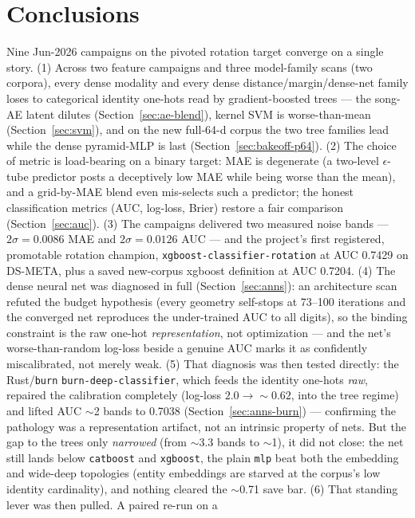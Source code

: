 \documentclass[11pt]{article}
\begin{document}
\section{Conclusions}
\label{sec:conclusions}
Nine Jun-2026 campaigns on the pivoted rotation target converge on a single
story. (1) Across two feature campaigns and three model-family scans (two
corpora), every dense modality and every dense distance/margin/dense-net family
loses to categorical identity one-hots read by gradient-boosted trees --- the
song-AE latent dilutes (Section~\ref{sec:ae-blend}), kernel SVM is
worse-than-mean (Section~\ref{sec:svm}), and on the new full-64-d corpus the two
tree families lead while the dense pyramid-MLP is last
(Section~\ref{sec:bakeoff-p64}). (2) The choice of metric is load-bearing on a
binary target: MAE is degenerate (a two-level $\epsilon$-tube predictor posts a
deceptively low MAE while being worse than the mean), and a grid-by-MAE blend
even mis-selects such a predictor; the honest classification metrics (AUC,
log-loss, Brier) restore a fair comparison (Section~\ref{sec:auc}). (3) The
campaigns delivered two measured noise bands --- $2\sigma=0.0086$ MAE and
$2\sigma=0.0126$ AUC --- and the project's first registered, promotable rotation
champion, \texttt{xgboost-classifier-rotation} at AUC 0.7429 on DS-META, plus a
saved new-corpus xgboost definition at AUC 0.7204. (4) The dense neural net was
diagnosed in full (Section~\ref{sec:anns}): an architecture scan refuted the
budget hypothesis (every geometry self-stops at 73--100 iterations and the
converged net reproduces the under-trained AUC to all digits), so the binding
constraint is the raw one-hot \emph{representation}, not optimization --- and the
net's worse-than-random log-loss beside a genuine AUC marks it as confidently
miscalibrated, not merely weak. (5) That diagnosis was then tested directly: the
Rust/\texttt{burn} \texttt{burn-deep-classifier}, which feeds the identity
one-hots \emph{raw}, repaired the calibration completely (log-loss
$2.0\to\sim 0.62$, into the tree regime) and lifted AUC $\sim$2 bands to
\num{0.7038} (Section~\ref{sec:anns-burn}) --- confirming the pathology was a
representation artifact, not an intrinsic property of nets. But the gap to the
trees only \emph{narrowed} (from $\sim$3.3 bands to $\sim$1), it did not close:
the net still lands below \texttt{catboost} and \texttt{xgboost}, the plain
\texttt{mlp} beat both the embedding and wide-deep topologies (entity embeddings
are starved at the corpus's low identity cardinality), and nothing cleared the
$\sim$0.71 save bar. (6) That standing lever was then pulled. A paired re-run on a
\end{document}
